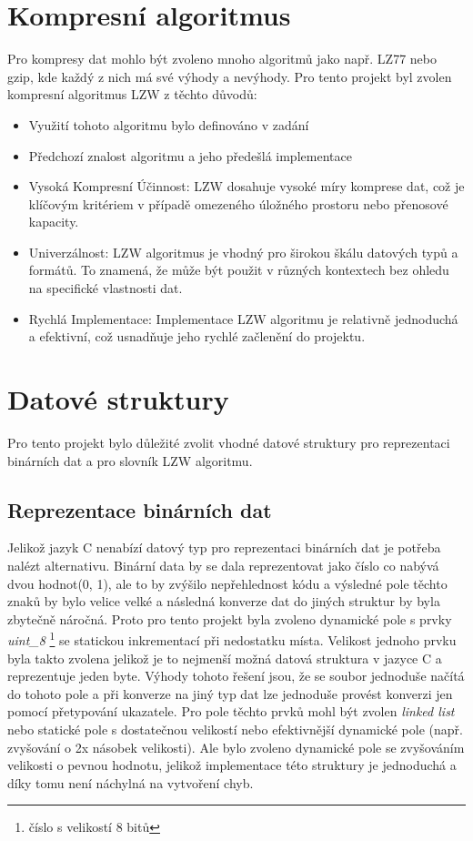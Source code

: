 \documentclass[12pt]{report}
\begin{document}
    \section{Kompresní algoritmus}
    Pro kompresy dat mohlo být zvoleno mnoho algoritmů jako např. LZ77 nebo gzip, kde každý z nich má své výhody a nevýhody. Pro tento projekt byl zvolen kompresní algoritmus LZW z těchto důvodů:
    \begin{itemize}
        \item Využití tohoto algoritmu bylo definováno v zadání
        \item Předchozí znalost algoritmu a jeho předešlá implementace
        \item Vysoká Kompresní Účinnost: LZW dosahuje vysoké míry komprese dat, což je klíčovým kritériem v případě omezeného úložného prostoru nebo přenosové kapacity.
        \item Univerzálnost: LZW algoritmus je vhodný pro širokou škálu datových typů a formátů. To znamená, že může být použit v různých kontextech bez ohledu na specifické vlastnosti dat.
        \item Rychlá Implementace: Implementace LZW algoritmu je relativně jednoduchá a efektivní, což usnadňuje jeho rychlé začlenění do projektu.
    \end{itemize}

    \section{Datové struktury}
    Pro tento projekt bylo důležité zvolit vhodné datové struktury pro reprezentaci binárních dat a pro slovník LZW algoritmu.

    \subsection{Reprezentace binárních dat}
    Jelikož jazyk C nenabízí datový typ pro reprezentaci binárních dat je potřeba nalézt alternativu. 
    Binární data by se dala reprezentovat jako číslo co nabývá dvou hodnot(0, 1), ale to by zvýšilo nepřehlednost kódu a výsledné pole těchto znaků by bylo velice velké a následná konverze dat do jiných struktur by byla zbytečně náročná. 
    Proto pro tento projekt byla zvoleno dynamické pole s prvky \textit{uint_8}  \footnote{číslo s velikostí 8 bitů} se statickou inkrementací při nedostatku místa. Velikost jednoho prvku byla takto zvolena jelikož je to nejmenší možná datová struktura v jazyce C a reprezentuje jeden byte. Výhody tohoto řešení jsou, že se soubor jednoduše načítá do tohoto pole a při konverze na jiný typ dat lze jednoduše provést konverzi jen pomocí přetypování ukazatele.
    Pro pole těchto prvků mohl být zvolen \textit{linked list} nebo statické pole s dostatečnou velikostí nebo efektivnější dynamické pole (např. zvyšování o 2x násobek velikosti). Ale bylo zvoleno dynamické pole se zvyšováním velikosti o pevnou hodnotu, jelikož implementace této struktury je jednoduchá a díky tomu není náchylná na vytvoření chyb.
\end{document}
